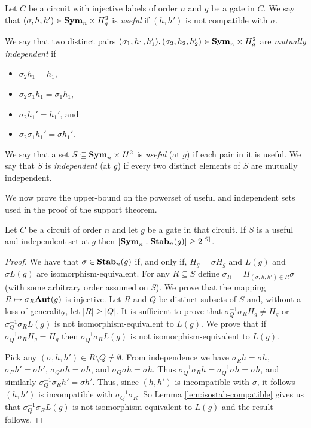 \documentclass[../paper.tex]{subfiles}
\begin{document}
\begin{definition}
  Let $C$ be a circuit with injective labels of order $n$ and $g$ be a gate in
  $C$. We say that $(\sigma, h, h') \in \text{\textbf{Sym}}_n \times H^2_g$ is \emph{useful} if
  $(h, h')$ is not compatible with $\sigma$.

  We say that two distinct pairs $(\sigma_1, h_1, h_1'), (\sigma_2, h_2, h_2')
  \in \text{\textbf{Sym}}_n\times H^2_g$ are \emph{mutually independent} if
  \begin{itemize}
    \setlength\itemsep{0mm}
  \item $\sigma_2 h_1 = h_1$,
  \item $\sigma_2 \sigma_1 h_1 = \sigma_1 h_1$,
  \item $\sigma_2 h_1' = h_1'$, and
  \item $\sigma_2 \sigma_1 h_1' = \sigma h_1'$.
  \end{itemize}
  We say that a set $S \subseteq \text{\textbf{Sym}}_n \times H^2$ is \emph{useful} (at $g$) if
  each pair in it is useful. We say that $S$ is \emph{independent} (at $g$) if
  every two distinct elements of $S$ are mutually independent.
\end{definition}

We now prove the upper-bound on the powerset of useful and independent sets used
in the proof of the support theorem.

\begin{lem}
  \label{lem:useful-independant-set}
  Let $C$ be a circuit of order $n$ and let $g$ be a gate in that circuit. If
  $S$ is a useful and independent set at $g$ then $[\text{\textbf{Sym}}_n : \text{\textbf{Stab}}_n(g)] \geq
  2^{\vert S \vert}$.
\end{lem}
\begin{proof}
  We have that $\sigma \in \text{\textbf{Stab}}_n(g)$ if, and only if, $H_g = \sigma H_g$ and
  $L(g)$ and $\sigma L(g)$ are isomorphism-equivalent. For any $R \subseteq S$
  define $\sigma_R = \Pi_{(\sigma, h, h') \in R} \sigma$ (with some arbitrary
  order assumed on $S$). We prove that the mapping $R \mapsto \sigma_R \text{\textbf{Aut}}(g)$
  is injective. Let $R$ and $Q$ be distinct subsets of $S$ and, without a loss
  of generality, let $\vert R \vert \geq \vert Q \vert$. It is sufficient to
  prove that $\sigma^{-1}_Q \sigma_R H_g \neq H_g$ or $\sigma^{-1}_Q \sigma_R
  L(g)$ is not isomorphism-equivalent to $L(g)$. We prove that if $\sigma^{-1}_Q
  \sigma_R H_g = H_g$ then $\sigma^{-1}_Q \sigma_R L(g)$ is not
  isomorphism-equivalent to $L(g)$.

  Pick any $(\sigma, h, h') \in R \setminus Q \neq \emptyset$. From independence
  we have $\sigma_R h = \sigma h$, $\sigma_R h' = \sigma h'$, $\sigma_Q \sigma h
  = \sigma h $, and $\sigma_Q \sigma h = \sigma h$. Thus $\sigma^{-1}_Q \sigma_R
  h = \sigma^{-1}_Q \sigma h = \sigma h$, and similarly $\sigma^{-1}_Q\sigma_R
  h' = \sigma h'$. Thus, since $(h, h')$ is incompatible with $\sigma$, it
  follows $(h, h')$ is incompatible with $\sigma^{-1}_Q\sigma_R$. So Lemma
  \ref{lem:isostab-compatible} gives us that $\sigma^{-1}_Q \sigma_R L(g)$ is
  not isomorphism-equivalent to $L(g)$ and the result follows.
\end{proof}
\end{document}
